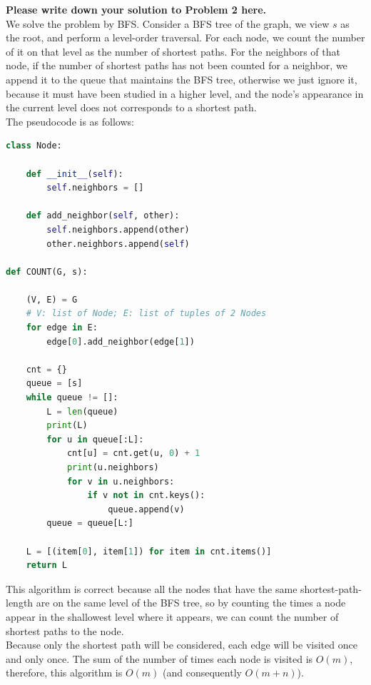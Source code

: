 \documentclass[11pt,twoside]{article}
\newenvironment{solution}{{\par\noindent\it Solution.}}{}
\begin{document}
\begin{solution}
\textbf{Please write down your solution to Problem 2 here.}
\vspace{10pt}\\
We solve the problem by BFS. Consider a BFS tree of the graph, we view $s$ as the root, 
and perform a level-order traversal. For each node, we count the number of it on that level as the number of shortest paths.
For the neighbors of that node, if the number of shortest paths has not been counted for a neighbor, 
we append it to the queue that maintains the BFS tree, otherwise we just ignore it, because it must have been studied in a higher level,
and the node's appearance in the current level does not corresponds to a shortest path.
\vspace{10pt}\\
The pseudocode is as follows:
\vspace{10pt}\\
\begin{lstlisting}[language=Python]
class Node:

    def __init__(self):
        self.neighbors = []

    def add_neighbor(self, other):
        self.neighbors.append(other)
        other.neighbors.append(self)

def COUNT(G, s):

    (V, E) = G 
    # V: list of Node; E: list of tuples of 2 Nodes
    for edge in E:
        edge[0].add_neighbor(edge[1])

    cnt = {}
    queue = [s]
    while queue != []:
        L = len(queue)
        print(L)
        for u in queue[:L]: 
            cnt[u] = cnt.get(u, 0) + 1
            print(u.neighbors)
            for v in u.neighbors:
                if v not in cnt.keys():
                    queue.append(v)
        queue = queue[L:]

    L = [(item[0], item[1]) for item in cnt.items()]
    return L
\end{lstlisting}
This algorithm is correct because all the nodes that have the same shortest-path-length are on the same level of the BFS tree, 
so by counting the times a node appear in the shallowest level where it appears, we can count the number of shortest paths to the node.
\vspace{10pt}\\
Because only the shortest path will be considered, each edge will be visited once and only once.
The sum of the number of times each node is visited is $O(m)$, therefore, this algorithm is $O(m)$ (and consequently $O(m+n)$).
\end{solution}
\end{document}
